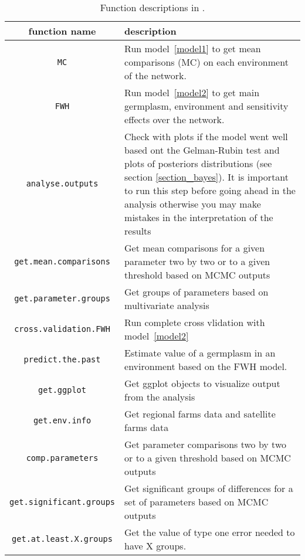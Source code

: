 \begin{table}[t]
\begin{tabular}{cp{}}

\hline
\textbf{function name} & \textbf{description} \\

\hline
\hline

\texttt{MC} & Run model~\ref{model1} to get mean comparisons (MC) on each environment of the network.\\
\hline

\texttt{FWH} & Run model~\ref{model2} to get main germplasm, environment and sensitivity effects over the network. \\
\hline

\texttt{analyse.outputs} & Check with plots if the model went well based ont the Gelman-Rubin test and plots of posteriors distributions (see section \ref{section_bayes}). It is important to run this step before going ahead in the analysis otherwise you may make mistakes in the interpretation of the results \\
\hline

\texttt{get.mean.comparisons} & Get mean comparisons for a given parameter two by two or to a given threshold based on MCMC outputs \\
\hline

\texttt{get.parameter.groups} & Get groups of parameters based on multivariate analysis \\
\hline

\texttt{cross.validation.FWH} & Run complete cross vlidation with model~\ref{model2} \\
\hline

\texttt{predict.the.past} & Estimate value of a germplasm in an environment based on the FWH model. \\
\hline

\texttt{get.ggplot} & Get ggplot objects to visualize output from the analysis \\
\hline

\hline


\texttt{get.env.info} & Get regional farms data and satellite farms data \\
\hline

\texttt{comp.parameters} & Get parameter comparisons two by two or to a given threshold based on MCMC outputs \\
\hline

\texttt{get.significant.groups} & Get significant groups of differences for a set of parameters based on MCMC outputs \\
\hline

\texttt{get.at.least.X.groups} & Get the value of type one error needed to have X groups. \\
\hline


\end{tabular}
\caption{Function descriptions in \pack.}
\label{function_descriptions}
\end{table}




